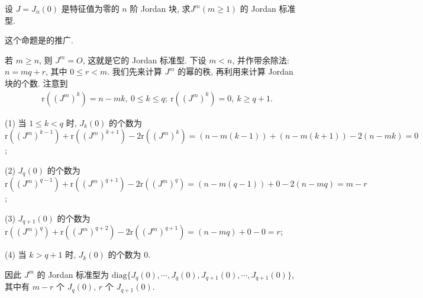 \documentclass[../../main.tex]{subfiles}%
\begin{document}
\begin{proposition}\label{proposition:J_n(0)的Jordan标准型的推广}
设 $J = J_n(0)$ 是特征值为零的 $n$ 阶 Jordan 块, 求$J^m (m \geqslant  1)$ 的 Jordan 标准型.
\end{proposition}
\begin{remark}
这个命题是的推广.
\end{remark}
\begin{solution}

若 $m \geqslant  n$, 则 $J^m = O$, 这就是它的 Jordan 标准型. 下设 $m < n$, 并作带余除法: $n = mq + r$, 其中 $0 \leqslant  r < m$. 我们先来计算 $J^m$ 的幂的秩, 再利用来计算 Jordan 块的个数. 注意到
\begin{align*}
&\mathrm{r}((J^m)^k) = n - mk, \ 0 \leqslant  k \leqslant  q; \ 
\mathrm{r}((J^m)^k) = 0, \ k \geqslant  q + 1.
\end{align*}

(1) 当 $1 \leqslant  k < q$ 时, $J_k(0)$ 的个数为 $\mathrm{r}((J^m)^{k - 1}) + \mathrm{r}((J^m)^{k + 1}) - 2\mathrm{r}((J^m)^k) = (n - m(k - 1)) + (n - m(k + 1)) - 2(n - mk) = 0$;

(2) $J_q(0)$ 的个数为 $\mathrm{r}((J^m)^{q - 1}) + \mathrm{r}((J^m)^{q + 1}) - 2\mathrm{r}((J^m)^q) = (n - m(q - 1)) + 0 - 2(n - mq) = m - r$;

(3) $J_{q + 1}(0)$ 的个数为 $\mathrm{r}((J^m)^q) + \mathrm{r}((J^m)^{q + 2}) - 2\mathrm{r}((J^m)^{q + 1}) = (n - mq) + 0 - 0 = r$;

(4) 当 $k > q + 1$ 时, $J_k(0)$ 的个数为 $0$.

因此 $J^m$ 的 Jordan 标准型为 $\mathrm{diag}\{J_q(0),\cdots,J_q(0),J_{q + 1}(0),\cdots,J_{q + 1}(0)\}$, 其中有 $m - r$ 个 $J_q(0)$, $r$ 个 $J_{q + 1}(0)$. 

\end{solution}
\end{document}

